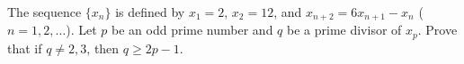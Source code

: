 The sequence $\{x_n\}$ is defined by $x_1=2$, $x_2=12$, and $x_{n+2}=6x_{n+1}-x_n$ ($n=1,2,\ldots$). Let $p$ be an odd prime number and $q$ be a prime divisor of $x_p$. Prove that if $q\neq2,3$, then $q\geq2p-1$.